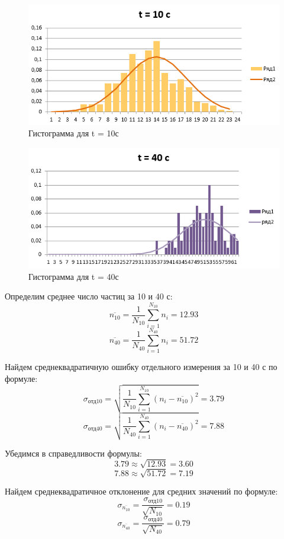 \documentclass[a4paper,12pt]{article}
\begin{document}
\begin{figure}[H]
\centering
\includegraphics[width=1.1\textwidth]{график для 10}
\caption{Гистограмма для t = 10с}
\end{figure}
\begin{figure}[H]
\centering
\includegraphics[width=1.1\textwidth]{график для 40}
\caption{Гистограмма для t = 40с}
\end{figure}

Определим среднее число частиц за 10 и 40 с:
\[\overline{n_{10}}=\frac{1}{N_{10}}\sum_{i=1}^{N_{10}} {n_i}=12.93\]
\[\overline{n_{40}}=\frac{1}{N_{40}}\sum_{i=1}^{N_{40}} {n_i}=51.72\]

Найдем среднеквадратичную ошибку отдельного измерения за 10 и 40 с по формуле:
\[\sigma_{\mbox{отд10}}=\sqrt{\frac{1}{N_{10}}\sum_{i=1}^{N_{10}}{(n_i-\overline{n_{10}})^2}}=3.79\]
\[\sigma_{\mbox{отд40}}=\sqrt{\frac{1}{N_{40}}\sum_{i=1}^{N_{40}}{(n_i-\overline{n_{40}})^2}}=7.88\]

Убедимся в справедливости формулы:
\[3.79\approx\sqrt{12.93}=3.60\]
\[7.88\approx\sqrt{51.72}=7.19\]

Найдем среднеквадратичное отклонение для средних значений по формуле:
\[\sigma_{\overline{n_{10}}}=\frac{\sigma_{\mbox{отд10}}}{\sqrt{N_{10}}}=0.19\]
\[\sigma_{\overline{n_{40}}}=\frac{\sigma_{\mbox{отд40}}}{\sqrt{N_{40}}}=0.79\]
\end{document}
